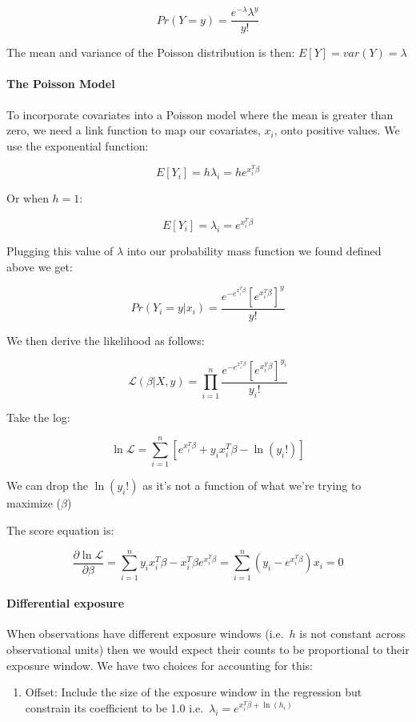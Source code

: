 \documentclass[
]{article}
\providecommand{\tightlist}{%
  \setlength{\itemsep}{0pt}\setlength{\parskip}{0pt}}
\begin{document}
\[Pr(Y=y)=\frac{e^{-\lambda}\lambda^y}{y!}\]

The mean and variance of the Poisson distribution is then:
\(E[Y]=var(Y)=\lambda\)

\hypertarget{the-poisson-model}{%
\paragraph{The Poisson Model}\label{the-poisson-model}}

To incorporate covariates into a Poisson model where the mean is greater
than zero, we need a link function to map our covariates, \(x_i\), onto
positive values. We use the exponential function:

\[E[Y_i]=h\lambda_i=he^{x_i^T\beta}\]

Or when \(h=1\):

\[E[Y_i]=\lambda_i=e^{x_i^T\beta}\]

Plugging this value of \(\lambda\) into our probability mass function we
found defined above we get:

\[Pr(Y_i=y|x_i)=\frac{e^{-e^{x_i^T\beta}}[e^{x_i^T\beta}]^y} {y!}\]

We then derive the likelihood as follows:

\[\mathcal{L}(\beta|X,y)=\prod_{i=1}^n\frac{e^{-e^{x_i^T\beta}}[e^{x_i^T \beta}]^{y_i}}{y_i!}\]

Take the log:

\[\ln\mathcal{L}=\sum_{i=1}^n [e^{x_i^T\beta} + y_ix_i^T\beta - \ln(y_i!)]\]

We can drop the \(\ln(y_i!)\) as it's not a function of what we're
trying to maximize (\(\beta\))

The score equation is:

\[\frac{\partial\ln\mathcal{L}}{\partial\beta}=\sum_{i=1}^n y_ix_i^T\beta-x_i^T\beta e^{x_i^T\beta}=\sum_{i=1}^n(y_i-e^{x_i^T\beta})x_i=0\]

\hypertarget{differential-exposure}{%
\paragraph{Differential exposure}\label{differential-exposure}}

When observations have different exposure windows (i.e.~\(h\) is not
constant across observational units) then we would expect their counts
to be proportional to their exposure window. We have two choices for
accounting for this:

\begin{enumerate}
\def\labelenumi{\arabic{enumi}.}
\tightlist
\item
  Offset: Include the size of the exposure window in the regression but
  constrain its coefficient to be 1.0
  i.e.~\(\lambda_i=e^{x_i^T\beta+\ln(h_i)}\)
\end{enumerate}
\end{document}
